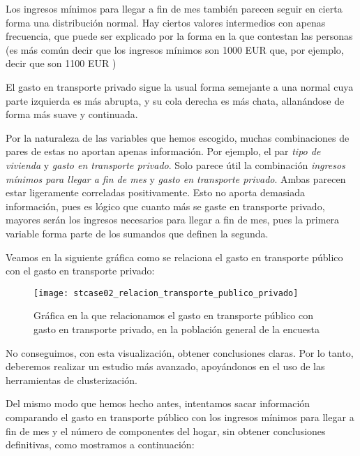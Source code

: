 \documentclass[11pt]{article}
\begin{document}
Los ingresos mínimos para llegar a fin de mes también parecen seguir en cierta forma una distribución normal. Hay ciertos valores intermedios con apenas frecuencia, que puede ser explicado por la forma en la que contestan las personas (es más común decir que los ingresos mínimos son 1000 EUR que, por ejemplo, decir que son 1100 EUR )

El gasto en transporte privado sigue la usual forma semejante a una normal cuya parte izquierda es más abrupta, y su cola derecha es más chata, allanándose de forma más suave y continuada.

Por la naturaleza de las variables que hemos escogido, muchas combinaciones de pares de estas no aportan apenas información. Por ejemplo, el par \emph{tipo de vivienda} y \emph{gasto en transporte privado}. Solo parece útil la combinación \emph{ingresos mínimos para llegar a fin de mes} y \emph{gasto en transporte privado}. Ambas parecen estar ligeramente correladas positivamente. Esto no aporta demasiada información, pues es lógico que cuanto más se gaste en transporte privado, mayores serán los ingresos necesarios para llegar a fin de mes, pues la primera variable forma parte de los sumandos que definen la segunda.

Veamos en la siguiente gráfica como se relaciona el gasto en transporte público con el gasto en transporte privado:

\begin{figure}[H]
    \centering

    \texttt{[image: stcase02\_relacion\_transporte\_publico\_privado]}
    \caption{Gráfica en la que relacionamos el gasto en transporte público con gasto en transporte privado, en la población general de la encuesta}
    \label{stcase02_relacion_tpublico_tprivado:figure}
\end{figure}

No conseguimos, con esta visualización, obtener conclusiones claras. Por lo tanto, deberemos realizar un estudio más avanzado, apoyándonos en el uso de las herramientas de clusterización.

Del mismo modo que hemos hecho antes, intentamos sacar información comparando el gasto en transporte público con los ingresos mínimos para llegar a fin de mes y el número de componentes del hogar, sin obtener conclusiones definitivas, como mostramos a continuación:
\end{document}

